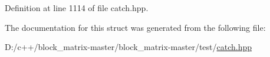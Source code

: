 Definition at line 1114 of file catch.\+hpp.



The documentation for this struct was generated from the following file\+:\begin{DoxyCompactItemize}
\item 
D\+:/c++/block\+\_\+matrix-\/master/block\+\_\+matrix-\/master/test/\mbox{\hyperlink{catch_8hpp}{catch.\+hpp}}\end{DoxyCompactItemize}
